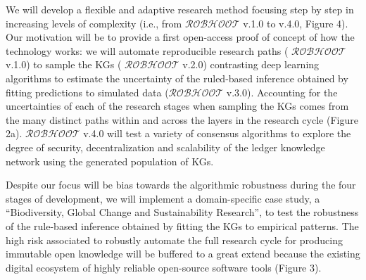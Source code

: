 \documentclass[10pt, a4paper, twocolumn]{article} %
\begin{document}
We will develop a flexible and adaptive research method focusing step
by step in increasing levels of complexity (i.e., from {\bf
  $\mathcal{ROBHOOT}$} v.1.0 to v.4.0, Figure 4). Our motivation will
be to provide a first open-access proof of concept of how the
technology works: we will automate reproducible research paths ({\bf
  $\mathcal{ROBHOOT}$} v.1.0) to sample the KGs ({\bf
  $\mathcal{ROBHOOT}$} v.2.0) contrasting deep learning algorithms to
estimate the uncertainty of the ruled-based inference obtained by
fitting predictions to simulated data ({\bf $\mathcal{ROBHOOT}$}
v.3.0). Accounting for the uncertainties of each of the research
stages when sampling the KGs comes from the many distinct paths within
and across the layers in the research cycle (Figure 2a). {\bf
  $\mathcal{ROBHOOT}$} v.4.0 will test a variety of consensus
algorithms to explore the degree of security, decentralization and
scalability of the ledger knowledge network using the generated
population of KGs.

Despite our focus will be bias towards the algorithmic robustness
during the four stages of development, we will implement a
domain-specific case study, a ``Biodiversity, Global Change and
Sustainability Research'', to test the robustness of the rule-based
inference obtained by fitting the KGs to empirical patterns. The high
risk associated to robustly automate the full research cycle for
producing immutable open knowledge will be buffered to a great extend
because the existing digital ecosystem of highly reliable open-source
software tools (Figure 3).




%


\end{document}
